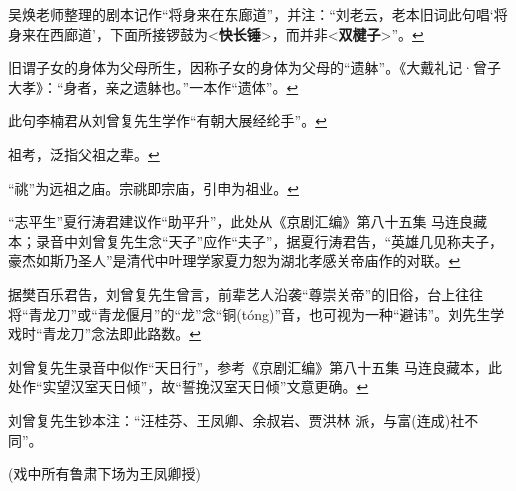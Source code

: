   \leavevmode\hypertarget{fn152}{}%
  吴焕老师整理的剧本记作``将身来在东廊道''，并注：``刘老云，老本旧词此句唱`将身来在西廊道'，下面所接锣鼓为\textless{}\textbf{快长锤}\textgreater{}，而并非\textless{}\textbf{双楗子}\textgreater{}''。\protect\hyperlink{fnref152}{↩}
\item
  \leavevmode\hypertarget{fn153}{}%
  旧谓子女的身体为父母所生，因称子女的身体为父母的``遗躰''。《大戴礼记·曾子大孝》：``身者，亲之遗躰也。''一本作``遗体''。\protect\hyperlink{fnref153}{↩}
\item
  \leavevmode\hypertarget{fn154}{}%
  此句李楠君从刘曾复先生学作``有朝大展经纶手''。\protect\hyperlink{fnref154}{↩}
\item
  \leavevmode\hypertarget{fn155}{}%
  祖考，泛指父祖之辈。\protect\hyperlink{fnref155}{↩}
\item
  \leavevmode\hypertarget{fn156}{}%
  ``祧''为远祖之庙。宗祧即宗庙，引申为祖业。\protect\hyperlink{fnref156}{↩}
\item
  \leavevmode\hypertarget{fn157}{}%
  ``志平生''夏行涛君建议作``助平升''，此处从《京剧汇编》第八十五集
  马连良藏本；录音中刘曾复先生念``天子''应作``夫子''，据夏行涛君告，``英雄几见称夫子，豪杰如斯乃圣人''是清代中叶理学家夏力恕为湖北孝感关帝庙作的对联。\protect\hyperlink{fnref157}{↩}
\item
  \leavevmode\hypertarget{fn158}{}%
  据樊百乐君告，刘曾复先生曾言，前辈艺人沿袭``尊崇关帝''的旧俗，台上往往将``青龙刀''或``青龙偃月''的``龙''念``铜(tóng)''音，也可视为一种``避讳''。刘先生学戏时``青龙刀''念法即此路数。\protect\hyperlink{fnref158}{↩}
\item
  \leavevmode\hypertarget{fn159}{}%
  刘曾复先生录音中似作``天日行''，参考《京剧汇编》第八十五集
  马连良藏本，此处作``实望汉室天日倾''，故``誓挽汉室天日倾''文意更确。\protect\hyperlink{fnref159}{↩}
\item
  \leavevmode\hypertarget{fn160}{}%
  刘曾复先生钞本注：``汪桂芬、王凤卿、余叔岩、贾洪林
  派，与富(连成)社不同''。

  (戏中所有鲁肃下场为王凤卿授)

